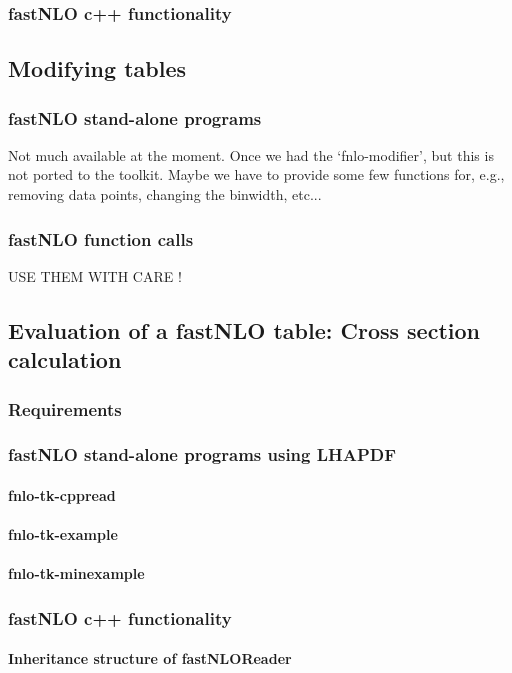 \documentclass[a4paper,11pt]{article}
\begin{document}
\subsubsection{fastNLO c++ functionality}

\subsection{Modifying tables}
\subsubsection{fastNLO stand-alone programs}
Not much available at the moment. Once we had the `fnlo-modifier', but this is not ported to the toolkit.
Maybe we have to provide some few functions for, e.g., removing data points, changing the binwidth, etc...
\subsubsection{fastNLO function calls}
USE THEM WITH CARE !

\subsection{Evaluation of a fastNLO table: Cross section calculation}
\subsubsection{Requirements}
\subsubsection{fastNLO stand-alone programs using LHAPDF}
\paragraph{fnlo-tk-cppread}
\paragraph{fnlo-tk-example}
\paragraph{fnlo-tk-minexample}
\subsubsection{fastNLO c++ functionality}
\paragraph{Inheritance structure of fastNLOReader}
\end{document}
